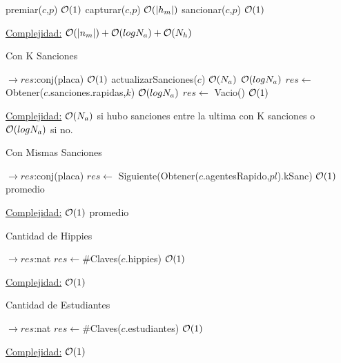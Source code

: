 \begin{Algoritmos}
\begin{algorithm}[H]
\begin{algorithmic}[1]
	\State premiar($c$,$p$) \Comment $\mathcal{O}(1)$
	\State capturar($c$,$p$) \Comment $\mathcal{O}(|h_m|)$
	\State sancionar($c$,$p$) \Comment $\mathcal{O}(1)$
\EndProcedure
\end{algorithmic}
\underline{Complejidad:} $\mathcal{O}(|n_m|) + \mathcal{O}(log N_a) + \mathcal{O}(N_h)$
\end{algorithm}


\begin{algorithm}[H]
\caption{Con K Sanciones}
\begin{algorithmic}[1]
 $\to res$:conj(placa)
	 \Comment $\mathcal{O}(1)$
		\State actualizarSanciones($c$) \Comment $\mathcal{O}(N_a)$
	\EndIf
	 \Comment $\mathcal{O}(log N_a)$
		\State $res \gets$ Obtener($c$.sanciones.rapidas,$k$) \Comment $\mathcal{O}(log N_a)$
	\Else
		\State $res \gets$ Vacio() \Comment $\mathcal{O}(1)$
	\EndIf
\EndProcedure
\end{algorithmic}
\underline{Complejidad:} $\mathcal{O}(N_a)$ si hubo sanciones entre la ultima con K sanciones o $\mathcal{O}(log N_a)$ si no.
\end{algorithm}

\begin{algorithm}[H]
\caption{Con Mismas Sanciones}
\begin{algorithmic}[1]
 $\to res$:conj(placa)
	\State $res \gets$ Siguiente(Obtener($c$.agentesRapido,$pl$).kSanc) \Comment $\mathcal{O}(1)$ promedio
\EndProcedure
\end{algorithmic}
\underline{Complejidad:} $\mathcal{O}(1)$ promedio
\end{algorithm}


\begin{algorithm}[H]
\caption{Cantidad de Hippies}
\begin{algorithmic}[1]
 $\to res$:nat
	\State $res \gets \#$Claves($c$.hippies) \Comment $\mathcal{O}(1)$
\EndProcedure
\end{algorithmic}
\underline{Complejidad:} $\mathcal{O}(1)$
\end{algorithm}

\begin{algorithm}[H]
\caption{Cantidad de Estudiantes}
\begin{algorithmic}[1]
 $\to res$:nat
	\State $res \gets \#$Claves($c$.estudiantes) \Comment $\mathcal{O}(1)$
\EndProcedure
\end{algorithmic}
\underline{Complejidad:} $\mathcal{O}(1)$
\end{algorithm}



\end{Algoritmos}

